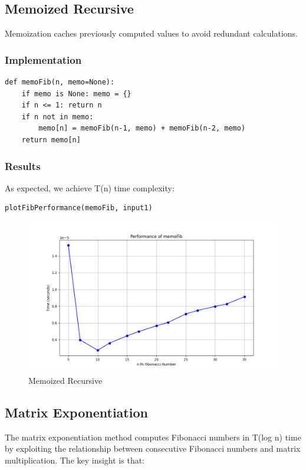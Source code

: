 \documentclass[a4paper, 12pt]{article}
\begin{document}
\subsection{Memoized Recursive}
\label{sec:org1ca3c80}
Memoization caches previously computed values to avoid redundant calculations.
\subsubsection{Implementation}
\label{sec:org9603c17}
\begin{verbatim}
def memoFib(n, memo=None):
    if memo is None: memo = {}
    if n <= 1: return n
    if n not in memo:
        memo[n] = memoFib(n-1, memo) + memoFib(n-2, memo)
    return memo[n]
\end{verbatim}
\subsubsection{Results}
\label{sec:org3b0e4df}
As expected, we achieve T(n) time complexity:
\begin{verbatim}
plotFibPerformance(memoFib, input1)
\end{verbatim}
\begin{figure}[htbp]  %
  \centering  %
  \includegraphics[width=\textwidth]{./memoFib.png}  %
  \caption{Memoized Recursive}  %
\end{figure}
\subsection{Matrix Exponentiation}
\label{sec:org3016d6d}
The matrix exponentiation method computes Fibonacci numbers in T(log n) time by exploiting the relationship between consecutive Fibonacci numbers and matrix multiplication. The key insight is that:
\end{document}
